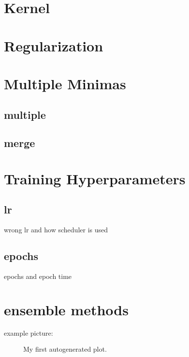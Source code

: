 \section{Kernel}\label{res:Kernel}

\section{Regularization}

\section{Multiple Minimas}\label{res:Multiple}
\subsection{multiple}
\subsection{merge}

\section{Training Hyperparameters}\label{res:Training}
\subsection{lr}\label{res:Learning rate}
wrong lr and how scheduler is used
\subsection{epochs}\label{res:Epochs}
epochs and epoch time

\section{ensemble methods}



example picture:
\begin{figure}[h]\label{fig:test}
    \begin{center}
        \caption{My first autogenerated plot.}
    \end{center}
\end{figure}